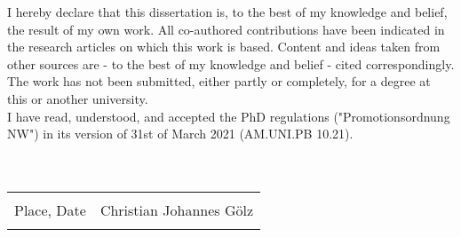 I hereby declare that this dissertation is, to the best of my knowledge and belief, the result of my own work. All co-authored contributions have been indicated in the research articles on which this work is based. Content and ideas taken from other sources are - to the best of my knowledge and belief - cited correspondingly. The work has not been submitted, either 
partly or completely, for a degree at this or another university.\\
I have read, understood, and accepted the PhD regulations ("Promotionsordnung NW") in its version of 31st of March 2021 (AM.UNI.PB 10.21).\\
\\
\\
\noindent
\begin{tabular}{@{}p{2.5in}p{2.5in}@{}}
  \dotfill & \dotfill \\
  Place, Date & Christian Johannes Gölz \\
  & \\[8ex]
\end{tabular}

